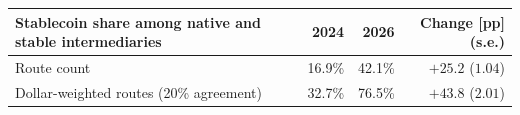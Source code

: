 \begin{tabularx}{\linewidth}{@{}>{\raggedright\arraybackslash}Xrrr@{}}
\toprule
Stablecoin share among native and stable intermediaries & 2024 & 2026 & Change [pp] (s.e.) \\
\midrule
Route count & 16.9\% & 42.1\% & $+25.2$ ($1.04$) \\
Dollar-weighted routes (20\% agreement) & 32.7\% & 76.5\% & $+43.8$ ($2.01$) \\
\bottomrule
\end{tabularx}
